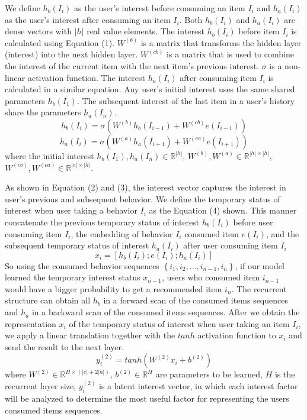 \documentclass[runningheads]{llncs}
\begin{document}
We define $h_{b}(I_{i})$ as the user's interest before consuming an item $I_{i}$ and $h_{a}(I_{i})$ as the user's interest after consuming an item $I_{i}$. Both $h_{b}(I_{i})$ and $h_{a}(I_{i})$ are dense vectors with $|h|$ real value elements. The interest $h_{b}(I_{i})$ before item $I_{i}$ is calculated using Equation (1). $W^{(b)}$ is a matrix that transforms the hidden layer (interest) into the next hidden layer. $W^{(cb)}$ is a matrix that is used to combine the interest of the current item with the next item's previous interest. $\sigma $ is a non-linear activation function. The interest $h_{a}(I_{i})$ after consuming item $I_{i}$ is calculated in a similar equation. Any user's initial interest uses the same shared parameters $h_{b}(I_{1})$. The subsequent interest of the last item in a user's history share the parameters $h_{a}(I_{n})$.
\begin{equation}
h_{b}(I_{i})=\sigma (W^{(b)}h_{b}(I_{i-1})+W^{(cb)}e(I_{i-1}))
\end{equation}
\begin{equation}
h_{a}(I_{i})=\sigma (W^{(a)}h_{a}(I_{i+1})+W^{(ca)}e(I_{i+1}))
\end{equation}
where the initial interest $h_{b}(I_{1}),h_{a}(I_{n})\in \mathbb{R}^{|h|}$, $W^{(b)},W^{(a)}\in \mathbb{R}^{|h|\times |h|}$, $W^{(cb)},W^{(ca)}\in \mathbb{R}^{|e|\times |h|}$.

As shown in Equation (2) and (3), the interest vector captures the interest in user's previous and subsequent behavior. We define the temporary status of interest when user taking a behavior $I_{i}$ as the Equation (4) shown. This manner concatenate the previous temporary status of interest $h_{b}(I_{i})$ before user consuming item $I_{i}$, the embedding of behavior $I_{i}$ consumed item $e(I_{i})$, and the subsequent temporary status of interest $h_{a}(I_{i})$ after user consuming item $I_{i}$
\begin{equation}
x_{i}=[h_{b}(I_{i});e(I_{i});h_{a}(I_{i})]
\end{equation}
So using the consumed behavior sequences $\left \{ i_{1},i_{2},...,i_{n-1},i_{n} \right \}$, if our model learned the temporary interest status $x_{n-1}$, users who consumed item $i_{n-1}$ would have a bigger probability to get a recommended item $i_{n}$. The recurrent structure can obtain all $h_{b}$ in a forward scan of the consumed items sequences and $h_{a}$ in a backward scan of the consumed items sequences. After we obtain the representation $x_{i}$ of the temporary status of interest when user taking an item $I_{i}$, we apply a linear translation together with the $tanh$ activation function to $x_{i}$ and send the result to the next layer.
\begin{equation}
y_{i}^{(2)}=tanh(W^{(2)}x_{i}+b^{(2)})
\end{equation}
where $W^{(2)}\in \mathbb{R}^{H\times (|e|+2|h|)}$, $b^{(2)}\in \mathbb{R}^{H}$ are parameters to be learned, $H$ is the recurrent layer size, $y_{i}^{(2)}$ is a latent interest vector, in which each interest factor will be analyzed to determine the most useful factor for representing the users consumed items sequences.
\end{document}
